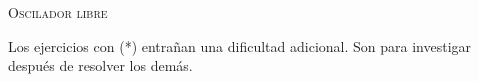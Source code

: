 \documentclass[11pt, spanish, a4paper, twoside]{article}
\begin{document}
\begin{center}
	\textsc{\LARGE Oscilador libre}\\
\end{center}

Los ejercicios con (*) entrañan una dificultad adicional. Son para investigar después de resolver los demás.


\begin{enumerate}



\end{enumerate}
\end{document}

